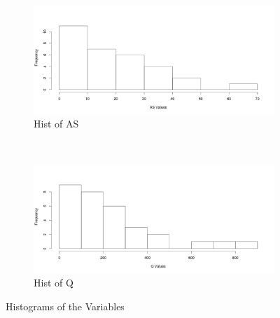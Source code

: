 \documentclass[a4paper,12pt, english]{article}
\begin{document}
\begin{figure}[H]
        ~ %
        \begin{subfigure}[b]{0.45\textwidth}
                \includegraphics[width=\textwidth]{as-hist}
                \caption{Hist of AS}
                \label{fig:as-hist}
        \end{subfigure}
        ~ %
        \begin{subfigure}[b]{0.45\textwidth}
                \includegraphics[width=\textwidth]{q-hist}
                \caption{Hist of Q}
                \label{fig:q-hist}
        \end{subfigure}
        \caption{Histograms of the Variables}
        \label{fig:histograms}
\end{figure}
\end{document}
